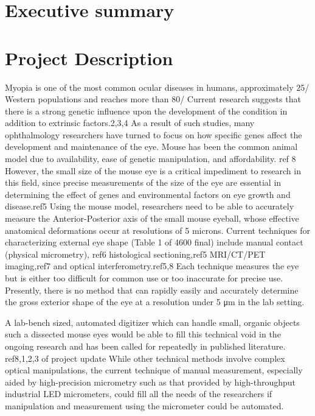 \documentclass{article}
\begin{document}

\setcounter{tocdepth}{3}
\tableofcontents
\newpage

\section*{Executive summary}
\label{sec:exec-summary}

\newpage

\section{Project Description}
\label{sec:project-description}

Myopia is one of the most common ocular diseases in humans, approximately 25/%
Western populations and reaches more than 80/%
Current research suggests that there is a strong genetic influence upon the development of the
condition in addition to extrinsic factors.\cite{zhou99:genes,zhou99:models,schmucker04}2,3,4
As a result of such studies, many ophthalmology researchers have turned to
focus on how specific genes affect the development and maintenance of the eye. Mouse
has been the common animal model due to availability, ease of genetic manipulation, and affordability. \cite{schaeffel04}ref 8 
However, the small size of the mouse eye is a critical impediment to research in 
this field, since precise measurements of the size of the eye are essential in determining
the effect of genes and environmental factors on eye growth and disease.\cite{schaeffel04}ref5 
Using the mouse model, researchers need to be able to accurately measure
the Anterior-Posterior axis of the small mouse eyeball, whose effective anatomical deformations 
occur at resolutions of 5 microns. 
Current techniques for characterizing external eye shape (Table 1 of 4600 final) include manual contact
(physical micrometry),\cite{wallman04} ref6 histological sectioning,\cite{schaeffel04}ref5 MRI/CT/PET imaging,\cite{atchison04}ref7 and optical
interferometry.\cite{schaeffel04,guggenheim04}ref5,8 Each technique measures the eye but is either too difficult for common
use or too inaccurate for precise use. Presently, there is no method that can rapidly 
easily and accurately determine the gross exterior shape of the eye at a resolution under 5 μm 
in the lab setting.

A lab-bench sized, automated digitizer which can handle small, organic objects such a dissected mouse
eyes would be able to fill this technical void in the ongoing research and has been called for repeatedly in
published literature. \cite{schaeffel04,atchison04,zhou99:genes,zhou99:models} ref8,1,2,3 of project update
While other technical methods involve complex optical manipulations, the current
technique of manual measurement, especially aided by high-precision micrometry such as that provided by
high-throughput industrial LED micrometers, could fill all the needs of the researchers if manipulation and
measurement using the micrometer could be automated.
\end{document}
